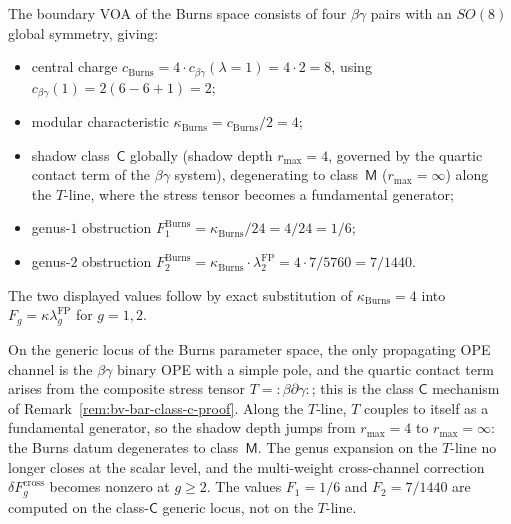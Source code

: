 \begin{computation}
\label{comp:v1-burns-koszul-datum}
The boundary VOA of the Burns space consists of four $\beta\gamma$
pairs with an $SO(8)$ global symmetry, giving:
\begin{itemize}[nosep]
\item central charge $c_{\mathrm{Burns}}
 = 4 \cdot c_{\beta\gamma}(\lambda{=}1)
 = 4 \cdot 2 = 8$,
 using $c_{\beta\gamma}(1) = 2(6 - 6 + 1) = 2$;
\item modular characteristic
 $\kappa_{\mathrm{Burns}} = c_{\mathrm{Burns}}/2 = 4$;
\item shadow class~$\mathsf{C}$ globally \textup{(}shadow depth
 $r_{\max} = 4$, governed by the quartic contact term of the
 $\beta\gamma$ system\textup{)}, degenerating to class~$\mathsf{M}$
 \textup{(}$r_{\max} = \infty$\textup{)} along the $T$-line, where
 the stress tensor becomes a fundamental generator;
\item genus-$1$ obstruction
 $F_1^{\mathrm{Burns}} = \kappa_{\mathrm{Burns}}/24 = 4/24 = 1/6$;
\item genus-$2$ obstruction
 $F_2^{\mathrm{Burns}} = \kappa_{\mathrm{Burns}} \cdot
 \lambda_2^{\mathrm{FP}} = 4 \cdot 7/5760 = 7/1440$.
\end{itemize}
The two displayed values follow by exact substitution of
$\kappa_{\mathrm{Burns}}=4$ into
$F_g=\kappa\lambda_g^{\mathrm{FP}}$ for $g=1,2$.
\end{computation}

\begin{remark}
\label{rem:burns-shadow-class}
On the generic locus of the Burns parameter space, the only
propagating OPE channel is the $\beta\gamma$ binary OPE with a
simple pole, and the quartic contact term arises from the composite
stress tensor $T = {:}\!\beta\partial\gamma\!{:}$; this is the class
$\mathsf{C}$ mechanism of
Remark~\ref{rem:bv-bar-class-c-proof}. Along the $T$-line, $T$
couples to itself as a fundamental generator, so the shadow depth
jumps from $r_{\max} = 4$ to $r_{\max} = \infty$: the Burns datum
degenerates to class~$\mathsf{M}$. The genus expansion on the
$T$-line no longer closes at the scalar level, and the
multi-weight cross-channel correction $\delta F_g^{\mathrm{cross}}$
becomes nonzero at $g \geq 2$. The values
$F_1 = 1/6$ and $F_2 = 7/1440$ are computed on the class-$\mathsf{C}$
generic locus, not on the $T$-line.
\end{remark}

